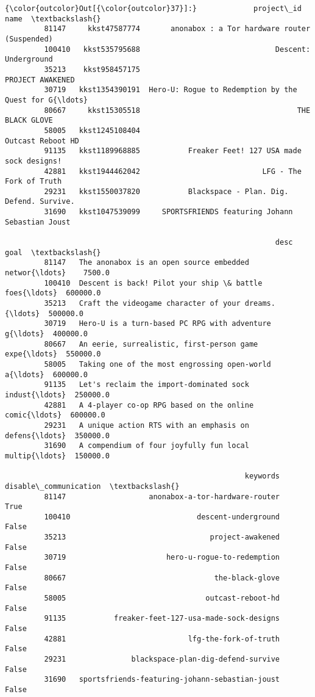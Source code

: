 \documentclass[11pt]{article}
\begin{document}
\begin{Verbatim}[commandchars=\\\{\}]
{\color{outcolor}Out[{\color{outcolor}37}]:}             project\_id                                               name  \textbackslash{}
         81147     kkst47587774       anonabox : a Tor hardware router (Suspended)   
         100410   kkst535795688                               Descent: Underground   
         35213    kkst958457175                                   PROJECT AWAKENED   
         30719   kkst1354390191  Hero-U: Rogue to Redemption by the Quest for G{\ldots}   
         80667     kkst15305518                                    THE BLACK GLOVE   
         58005   kkst1245108404                                  Outcast Reboot HD   
         91135   kkst1189968885           Freaker Feet! 127 USA made sock designs!   
         42881   kkst1944462042                            LFG - The Fork of Truth   
         29231   kkst1550037820           Blackspace - Plan. Dig. Defend. Survive.   
         31690   kkst1047539099     SPORTSFRIENDS featuring Johann Sebastian Joust   
         
                                                              desc      goal  \textbackslash{}
         81147   The anonabox is an open source embedded networ{\ldots}    7500.0   
         100410  Descent is back! Pilot your ship \& battle foes{\ldots}  600000.0   
         35213   Craft the videogame character of your dreams. {\ldots}  500000.0   
         30719   Hero-U is a turn-based PC RPG with adventure g{\ldots}  400000.0   
         80667   An eerie, surrealistic, first-person game expe{\ldots}  550000.0   
         58005   Taking one of the most engrossing open-world a{\ldots}  600000.0   
         91135   Let's reclaim the import-dominated sock indust{\ldots}  250000.0   
         42881   A 4-player co-op RPG based on the online comic{\ldots}  600000.0   
         29231   A unique action RTS with an emphasis on defens{\ldots}  350000.0   
         31690   A compendium of four joyfully fun local multip{\ldots}  150000.0   
         
                                                       keywords  disable\_communication  \textbackslash{}
         81147                   anonabox-a-tor-hardware-router                   True   
         100410                             descent-underground                  False   
         35213                                 project-awakened                  False   
         30719                       hero-u-rogue-to-redemption                  False   
         80667                                  the-black-glove                  False   
         58005                                outcast-reboot-hd                  False   
         91135           freaker-feet-127-usa-made-sock-designs                  False   
         42881                            lfg-the-fork-of-truth                  False   
         29231               blackspace-plan-dig-defend-survive                  False   
         31690   sportsfriends-featuring-johann-sebastian-joust                  False   
         

\end{Verbatim}
\end{document}
